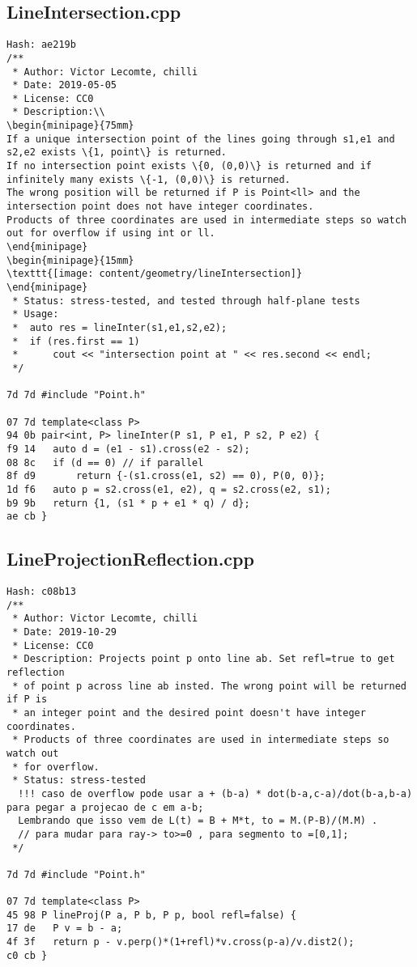 \documentclass[11pt, a4paper, twoside]{article}
\begin{document}
\subsection{LineIntersection.cpp}
\begin{lstlisting}
Hash: ae219b
/**
 * Author: Victor Lecomte, chilli
 * Date: 2019-05-05
 * License: CC0
 * Description:\\
\begin{minipage}{75mm}
If a unique intersection point of the lines going through s1,e1 and s2,e2 exists \{1, point\} is returned.
If no intersection point exists \{0, (0,0)\} is returned and if infinitely many exists \{-1, (0,0)\} is returned.
The wrong position will be returned if P is Point<ll> and the intersection point does not have integer coordinates.
Products of three coordinates are used in intermediate steps so watch out for overflow if using int or ll.
\end{minipage}
\begin{minipage}{15mm}
\texttt{[image: content/geometry/lineIntersection]}
\end{minipage}
 * Status: stress-tested, and tested through half-plane tests
 * Usage:
 * 	auto res = lineInter(s1,e1,s2,e2);
 * 	if (res.first == 1)
 * 		cout << "intersection point at " << res.second << endl;
 */

7d 7d #include "Point.h"

07 7d template<class P>
94 0b pair<int, P> lineInter(P s1, P e1, P s2, P e2) {
f9 14 	auto d = (e1 - s1).cross(e2 - s2);
08 8c 	if (d == 0) // if parallel
8f d9 		return {-(s1.cross(e1, s2) == 0), P(0, 0)};
1d f6 	auto p = s2.cross(e1, e2), q = s2.cross(e2, s1);
b9 9b 	return {1, (s1 * p + e1 * q) / d};
ae cb }
\end{lstlisting}

\subsection{LineProjectionReflection.cpp}
\begin{lstlisting}
Hash: c08b13
/**
 * Author: Victor Lecomte, chilli
 * Date: 2019-10-29
 * License: CC0
 * Description: Projects point p onto line ab. Set refl=true to get reflection
 * of point p across line ab insted. The wrong point will be returned if P is
 * an integer point and the desired point doesn't have integer coordinates.
 * Products of three coordinates are used in intermediate steps so watch out
 * for overflow.
 * Status: stress-tested
  !!! caso de overflow pode usar a + (b-a) * dot(b-a,c-a)/dot(b-a,b-a) para pegar a projecao de c em a-b;
  Lembrando que isso vem de L(t) = B + M*t, to = M.(P-B)/(M.M) . 
  // para mudar para ray-> to>=0 , para segmento to =[0,1];
 */

7d 7d #include "Point.h"

07 7d template<class P>
45 98 P lineProj(P a, P b, P p, bool refl=false) {
17 de 	P v = b - a;
4f 3f 	return p - v.perp()*(1+refl)*v.cross(p-a)/v.dist2();
c0 cb }
\end{lstlisting}
\end{document}
